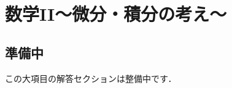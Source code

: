 \documentclass[../../ms_a.tex]{subfiles}
\begin{document}
\section{数学II～微分・積分の考え～}

\subsection*{準備中}
この大項目の解答セクションは整備中です．
\end{document}

